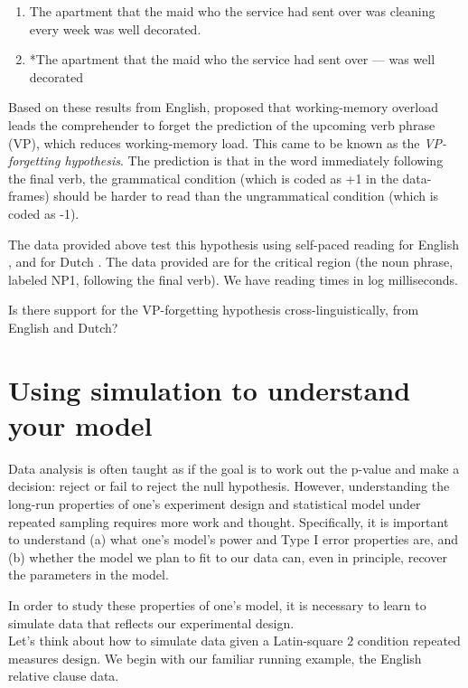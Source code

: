 \documentclass[12pt,]{krantz}
\begin{document}
\begin{enumerate}
\def\labelenumi{(\alph{enumi})}
\item
  The apartment that the maid who the service had sent over was cleaning every week was well decorated.
\item
  *The apartment that the maid who the service had sent over --- was well decorated
\end{enumerate}

Based on these results from English, \citet{gibsonthomas97} proposed that working-memory overload leads the comprehender to forget the prediction of the upcoming verb phrase (VP), which reduces working-memory load. This came to be known as the \emph{VP-forgetting hypothesis}. The prediction is that in the word immediately following the final verb, the grammatical condition (which is coded as +1 in the data-frames) should be harder to read than the ungrammatical condition (which is coded as -1).

The data provided above test this hypothesis using self-paced reading for English \citep{VSLK08}, and for Dutch \citep{FrankEtAl2015}. The data provided are for the critical region (the noun phrase, labeled NP1, following the final verb). We have reading times in log milliseconds.

Is there support for the VP-forgetting hypothesis cross-linguistically, from English and Dutch?

\hypertarget{using-simulation-to-understand-your-model}{%
\chapter{Using simulation to understand your model}\label{using-simulation-to-understand-your-model}}

Data analysis is often taught as if the goal is to work out the p-value and make a decision: reject or fail to reject the null hypothesis. However, understanding the long-run properties of one's experiment design and statistical model under repeated sampling requires more work and thought. Specifically, it is important to understand (a) what one's model's power and Type I error properties are, and (b) whether the model we plan to fit to our data can, even in principle, recover the parameters in the model.

In order to study these properties of one's model, it is necessary to learn to simulate data that reflects our experimental design.\\
Let's think about how to simulate data given a Latin-square \(2\) condition repeated measures design. We begin with our familiar running example, the \citet{grodner} English relative clause data.
\end{document}

